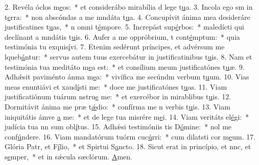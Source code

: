 2. Revéla óclos m\uline{e}os:~* et considerábo mirabília d lege t\uline{u}a.
3. Incola ego sm in t\uline{e}rra:~* non abscóndas a me mndáta t\uline{u}a.
4. Concupívit ánima mea desideráre justificatines t\uline{u}as,~* n omni t\uline{é}mpore.
5. Increpást sup\uline{é}rbos:~* maledícti qui declínant a mndátis t\uline{u}is.
6. Aufer a me oppróbrium, t cont\uline{é}mptum:~* quia testimónia tu exquis\uline{í}vi.
7. Etenim sedérunt príncipes, et advérsum me lqueb\uline{á}ntur:~* servus autem tuus exercebátur in justificatinibus t\uline{u}is.
8. Nam et testimónia tua meditáto m\uline{e}a est:~* et consílium meum justificatónes t\uline{u}æ.
9. Adhǽsit paviménto ánma m\uline{e}a:~* vivífica me secúndm verbum t\uline{u}um.
10. Vias meas enuntiávi et xaud\uline{í}sti me:~* doce me justificatónes t\uline{u}as.
11. Viam justificatiónum tuárum nstru\uline{e} me:~* et exercébor in mirablibus t\uline{u}is.
12. Dormitávit ánima me præ t\uline{ǽ}dio:~* confírma me n verbis t\uline{u}is.
13. Viam iniquitátis ámve \uline{a} me:~* et de lege tua misrére m\uline{e}i.
14. Viam veritáts el\uline{é}gi:~* judícia tua nn sum obl\uline{í}tus.
15. Adhǽsi testimóniis tis D\uline{ó}mine:~* nol me conf\uline{ú}ndere.
16. Viam mandatórum tuórm cuc\uline{ú}rri:~* cum dilatsti cor m\uline{e}um.
17. Glória Patr, et F\uline{í}lio,~* et Spirtui S\uline{a}ncto.
18. Sicut erat in princípio, et nnc, et s\uline{e}mper,~* et in sǽcula sæclórum. \uline{A}men.
